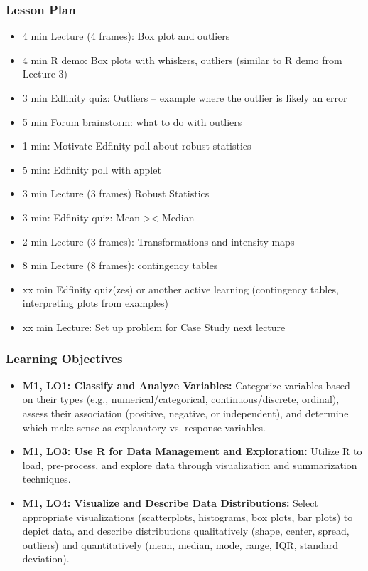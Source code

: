 \begin{frame}
    \frametitle{Lesson Plan}
    \begin{itemize}
        \item 4 min Lecture (4 frames): Box plot and outliers
        \item 4 min R demo: Box plots with whiskers, outliers (similar to R demo from Lecture 3)
        \item 3 min Edfinity quiz: Outliers -- example where the outlier is likely an error
        \item 5 min Forum brainstorm: what to do with outliers
        \item 1 min: Motivate Edfinity poll about robust statistics
        \item 5 min: Edfinity poll with applet
        \item 3 min Lecture (3 frames) Robust Statistics 
        \item 3 min: Edfinity quiz: Mean >< Median
        \item 2 min Lecture (3 frames): Transformations and intensity maps
        \item 8 min Lecture (8 frames): contingency tables
        \item xx min Edfinity quiz(zes) or another active learning (contingency tables, interpreting plots from examples)
        \item xx min Lecture: Set up problem for Case Study next lecture
    \end{itemize}
\end{frame}

\begin{frame}
    \frametitle{Learning Objectives}
    \begin{itemize}
        \item \textbf{M1, LO1: Classify and Analyze Variables:} Categorize variables based on their types (e.g., numerical/categorical, continuous/discrete, ordinal), assess their association (positive, negative, or independent), and determine which make sense as explanatory vs. response variables.
        \item \textbf{M1, LO3: Use R for Data Management and Exploration:} Utilize R to load, pre-process, and explore data through visualization and summarization techniques.
        \item \textbf{M1, LO4: Visualize and Describe Data Distributions:} Select appropriate visualizations (scatterplots, histograms, box plots, bar plots) to depict data, and describe distributions qualitatively (shape, center, spread, outliers) and quantitatively (mean, median, mode, range, IQR, standard deviation).
    \end{itemize}
\end{frame}

